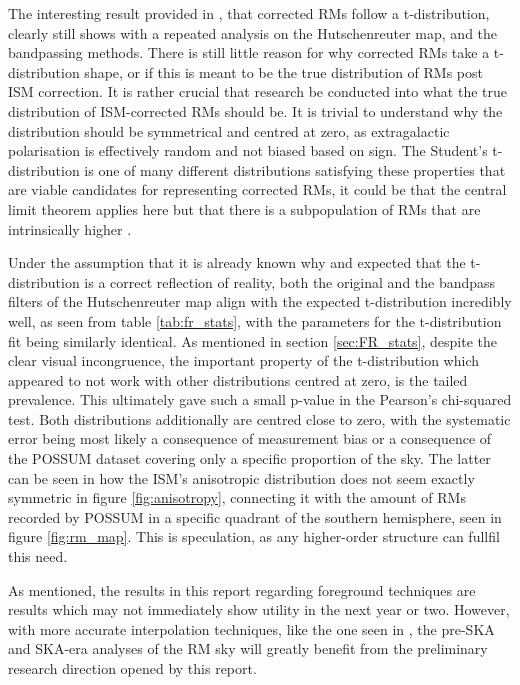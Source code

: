 The interesting result provided in \cite{ID73}, that corrected RMs follow a t-distribution, clearly still shows with a repeated analysis on the Hutschenreuter map, and the bandpassing methods. There is still little reason for why corrected RMs take a t-distribution shape, or if this is meant to be the true distribution of RMs post ISM correction. It is rather crucial that research be conducted into what the true distribution of ISM-corrected RMs should be. It is trivial to understand why the distribution should be symmetrical and centred at zero, as extragalactic polarisation is effectively random and not biased based on sign. The Student's t-distribution is one of many different distributions satisfying these properties that are viable candidates for representing corrected RMs, it could be that the central limit theorem applies here but that there is a subpopulation of RMs that are intrinsically higher \citep{ID1}.


Under the assumption that it is already known why and expected that the t-distribution is a correct reflection of reality, both the original and the bandpass filters of the Hutschenreuter map align with the expected t-distribution incredibly well, as seen from table \ref{tab:fr_stats}, with the parameters for the t-distribution fit being similarly identical. As mentioned in section \ref{sec:FR_stats}, despite the clear visual incongruence, the important property of the t-distribution which appeared to not work with other distributions centred at zero, is the tailed prevalence. This ultimately gave such a small p-value in the Pearson's chi-squared test. Both distributions additionally are centred close to zero, with the systematic error being most likely a consequence of measurement bias or a consequence of the POSSUM dataset covering only a specific proportion of the sky. The latter can be seen in how the ISM's anisotropic distribution does not seem exactly symmetric in figure \ref{fig:anisotropy}, connecting it with the amount of RMs recorded by POSSUM in a specific quadrant of the southern hemisphere, seen in figure \ref{fig:rm_map}. This is speculation, as any higher-order structure can fullfil this need.


As mentioned, the results in this report regarding foreground techniques are results which may not immediately show utility in the next year or two. However, with more accurate interpolation techniques, like the one seen in \cite{ID58}, the pre-SKA and SKA-era analyses of the RM sky will greatly benefit from the preliminary research direction opened by this report.

